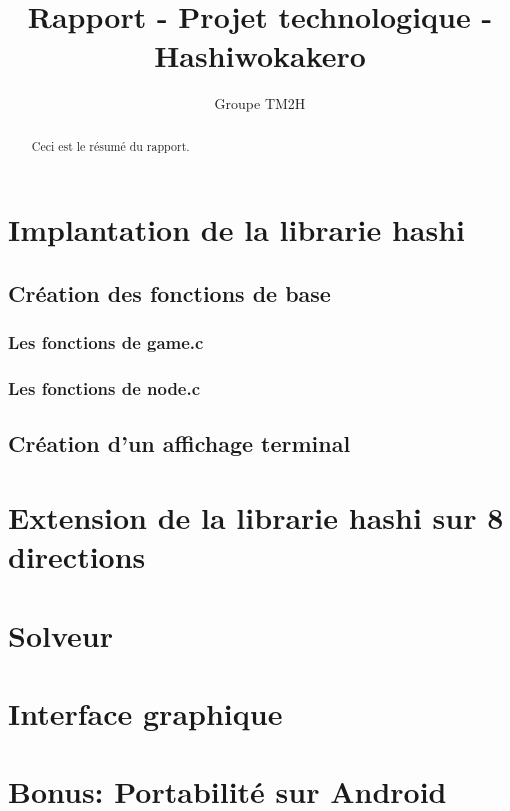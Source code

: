 \documentclass[12pt]{article}
\title{Rapport - Projet technologique - Hashiwokakero}
\author{Groupe TM2H}
\begin{document}
\maketitle

\begin{abstract}
Ceci est le résumé du rapport.
\end{abstract}

\tableofcontents

\section{Implantation de la librarie hashi}

\subsection{Création des fonctions de base}

\subsubsection{Les fonctions de game.c}

\subsubsection{Les fonctions de node.c}

\subsection{Création d'un affichage terminal}

\section{Extension de la librarie hashi sur 8 directions}

\section{Solveur}

\section{Interface graphique}

\section{Bonus: Portabilité sur Android}
\end{document}
